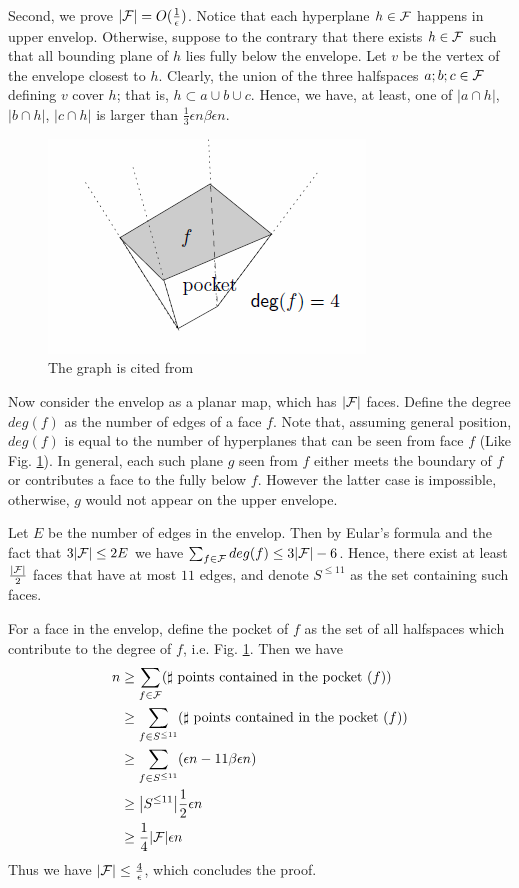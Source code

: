 \documentclass[11pt]{article}
\begin{document}
Second, we prove $|\mathcal{F}|=O(\frac{1}{\epsilon})$. Notice that each hyperplane $h\in \mathcal{F}$ happens in upper envelop. 
Otherwise, suppose to the contrary that there exists 
	$h \in \mathcal{F}$ such that all bounding plane of $h$ lies fully below the envelope. 
Let $v$ be the vertex of the
	envelope closest to $h$. 
Clearly, the union of the three halfspaces $a; b; c \in  \mathcal{F}$ defining $v$ cover $h$; that
is, $h \subset a\cup b\cup c$. 
Hence, we have, at least, one of $|a\cap h|$, $|b\cap h|$, $|c\cap h|$ is larger than $\frac{1}{3} \epsilon n\beta \epsilon n$.


\begin{figure}[htbp]	
		\centering
		\label{g1}
\includegraphics[scale=0.5]{pocket}
\caption{The graph is cited from \cite{har2014epsilon}}
\end{figure}


Now  consider the envelop  as a planar map, which has $|\mathcal{F}|$ faces. 
Define the degree $deg(f)$ as the number of edges of a face $f$. 
Note that, assuming general position, $deg(f)$ is equal to the number of hyperplanes that can be seen from face $f$ (Like Fig. \ref{g1}).
In general, each such plane $g$ seen from $f$ either meets the boundary of $f$ or
	contributes a face to the fully below $f$.
However the latter case is impossible, otherwise, 
	$g$ would not appear on the upper envelope.
 
Let $E$ be the number of edges in the envelop. 
Then by Eular's formula and the fact that $3|\mathcal{F}|\leq 2E$  we have $\sum_{f\in\mathcal{F}} deg(f)\leq 3|\mathcal{F}|-6$. 
Hence, there exist at least $\frac{|\mathcal{F}|}{2}$ faces that have at most $11$ edges, and denote $S^{\leq 11}$ 
	as the set containing such faces. 

For a face in the envelop, define the pocket of $f$ as the set of all halfspaces which contribute to the degree of $f$, i.e. Fig. \ref{g1}. 
Then we have 
\begin{align*}
n&\geq \sum_{f\in \mathcal{F}} (\text{$\sharp$ points contained in the pocket ($f$)})\\
&\geq \sum_{f\in S^{\leq 11}}(\text{$\sharp$ points contained in the pocket ($f$)})\\
&\geq \sum_{f\in S^{\leq 11}}(\epsilon n- 11\beta \epsilon n)\\
&\geq \big|S^{\leq 11}\big|\frac{1}{2}\epsilon n\\
&\geq \frac{1}{4}|\mathcal{F}|\epsilon n
\end{align*}
Thus we have $|\mathcal{F}|\leq \frac{4}{\epsilon}$, which concludes the proof. 
\end{document}

